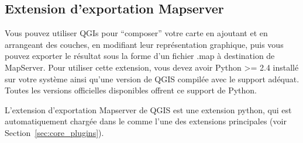 
%
%

\subsection{Extension d'exportation Mapserver}\label{sec:mapserver_export}

Vous pouvez utiliser QGIs pour ``composer'' votre carte en ajoutant et en arrangeant des couches, en modifiant leur repr\'esentation graphique, puis vous pouvez exporter le r\'esultat sous la forme d'un fichier .map \`a destination de MapServer. Pour utiliser cette extension, vous devez avoir Python >= 2.4 install\'e sur votre syst\`eme ainsi qu'une version de QGIS compil\'ee avec le support ad\'equat. Toutes les versions officielles disponibles offrent ce support de Python.

L'extension d'exportation Mapserver de QGIS \CURRENT est une extension python, qui est automatiquement charg\'ee dans le  comme l'une des extensions principales (voir Section~\ref{sec:core_plugins}).

%

